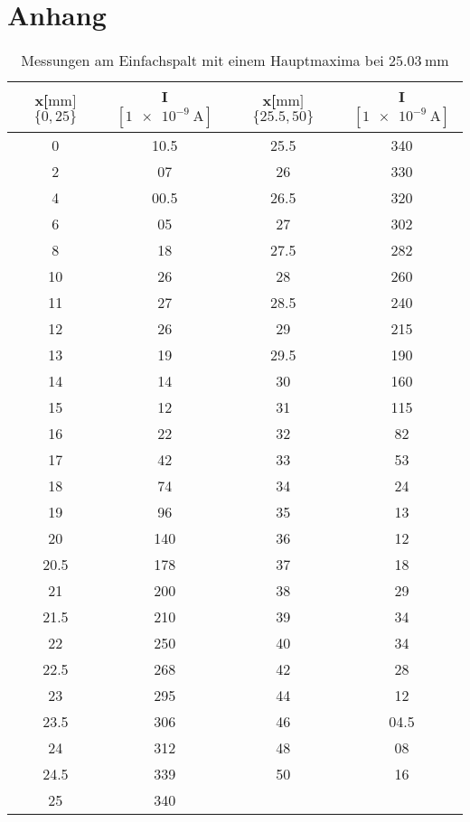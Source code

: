 \section{Anhang}

\begin{table}
    \centering
    \caption{Messungen am Einfachspalt mit einem Hauptmaxima bei $\SI{25.03}{\mm}$}
    \label{tab:einfach}
    \begin{tabular}{c c c c}
        \toprule
        x[$\si{\mm}]$  $\{0,25\}$ & I $[\SI{1e-9}{\ampere}]$ &  x[$\si{\mm}]$  $\{25.5,50\}$ & I $[\SI{1e-9}{\ampere}]$\\
        \midrule
        0        &     10.5 & 25.5     &     340  \\                                   
        2        &     07   & 26       &     330  \\    
        4        &     00.5 & 26.5     &     320  \\  
        6        &     05   & 27       &     302  \\
        8        &     18   & 27.5     &     282  \\
        10       &     26   & 28       &     260  \\
        11       &     27   & 28.5     &     240  \\
        12       &     26   & 29       &     215  \\
        13       &     19   & 29.5     &     190  \\
        14       &     14   & 30       &     160  \\
        15       &     12   & 31       &     115  \\
        16       &     22   & 32       &     82   \\
        17       &     42   & 33       &     53   \\
        18       &     74   & 34       &     24   \\
        19       &     96   & 35       &     13   \\
        20       &     140  & 36       &     12   \\ 
        20.5     &     178  & 37       &     18   \\     
        21       &     200  & 38       &     29   \\ 
        21.5     &     210  & 39       &     34   \\     
        22       &     250  & 40       &     34   \\  
        22.5     &     268  & 42       &     28   \\     
        23       &     295  & 44       &     12   \\ 
        23.5     &     306  & 46       &     04.5 \\     
        24       &     312  & 48       &     08   \\ 
        24.5     &     339  & 50       &     16   \\     
        25       &     340  & ~ &~ \\
        \bottomrule
    \end{tabular}
\end{table}



